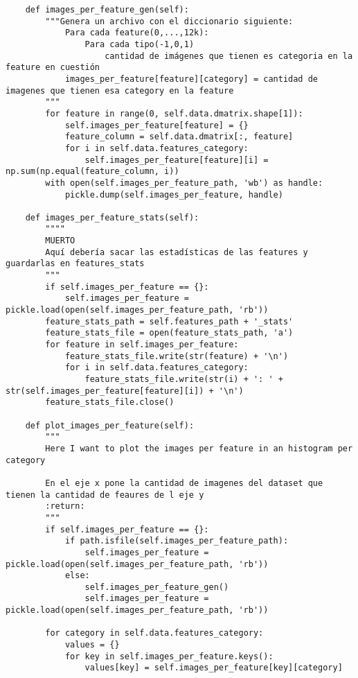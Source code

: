\documentclass[12,twoside]{TFG-GM}
\theoremstyle{definition}
\theoremstyle{remark}
\begin{document}
\begin{verbatim}
    def images_per_feature_gen(self):
        """Genera un archivo con el diccionario siguiente:
            Para cada feature(0,...,12k):
                Para cada tipo(-1,0,1)
                    cantidad de imágenes que tienen es categoria en la feature en cuestión
            images_per_feature[feature][category] = cantidad de imagenes que tienen esa category en la feature
        """
        for feature in range(0, self.data.dmatrix.shape[1]):
            self.images_per_feature[feature] = {}
            feature_column = self.data.dmatrix[:, feature]
            for i in self.data.features_category:
                self.images_per_feature[feature][i] = np.sum(np.equal(feature_column, i))
        with open(self.images_per_feature_path, 'wb') as handle:
            pickle.dump(self.images_per_feature, handle)

    def images_per_feature_stats(self):
        """"
        MUERTO
        Aquí debería sacar las estadísticas de las features y guardarlas en features_stats
        """
        if self.images_per_feature == {}:
            self.images_per_feature = pickle.load(open(self.images_per_feature_path, 'rb'))
        feature_stats_path = self.features_path + '_stats'
        feature_stats_file = open(feature_stats_path, 'a')
        for feature in self.images_per_feature:
            feature_stats_file.write(str(feature) + '\n')
            for i in self.data.features_category:
                feature_stats_file.write(str(i) + ': ' + str(self.images_per_feature[feature][i]) + '\n')
        feature_stats_file.close()

    def plot_images_per_feature(self):
        """
        Here I want to plot the images per feature in an histogram per category

        En el eje x pone la cantidad de imagenes del dataset que tienen la cantidad de feaures de l eje y
        :return:
        """
        if self.images_per_feature == {}:
            if path.isfile(self.images_per_feature_path):
                self.images_per_feature = pickle.load(open(self.images_per_feature_path, 'rb'))
            else:
                self.images_per_feature_gen()
                self.images_per_feature = pickle.load(open(self.images_per_feature_path, 'rb'))

        for category in self.data.features_category:
            values = {}
            for key in self.images_per_feature.keys():
                values[key] = self.images_per_feature[key][category]


\end{verbatim}
\end{document}

